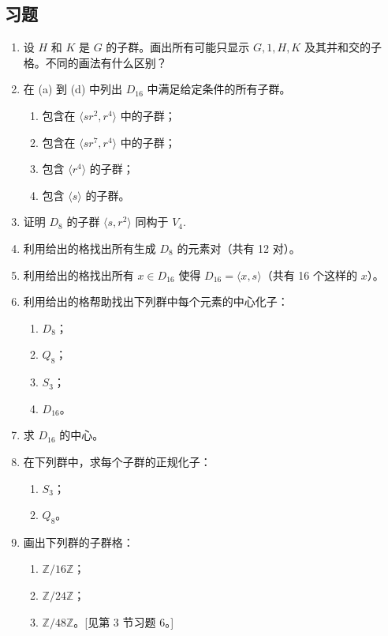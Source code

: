 \subsection*{习题}

\begin{enumerate}[label=\arabic*]
\item 设 \(H\) 和 \(K\) 是 \(G\) 的子群。画出所有可能只显示 \(G, 1, H, K\) 及其并和交的子格。不同的画法有什么区别？

\item 在 (a) 到 (d) 中列出 \(D_{16}\) 中满足给定条件的所有子群。
\begin{enumerate}[label=(\alph*)]
\item 包含在 \(\langle sr^2, r^4 \rangle\) 中的子群；
\item 包含在 \(\langle sr^7, r^4 \rangle\) 中的子群；
\item 包含 \(\langle r^4 \rangle\) 的子群；
\item 包含 \(\langle s \rangle\) 的子群。
\end{enumerate}

\item 证明 \(D_8\) 的子群 \(\langle s, r^2 \rangle\) 同构于 \(V_4\).

\item 利用给出的格找出所有生成 \(D_8\) 的元素对（共有 12 对）。

\item 利用给出的格找出所有 \(x \in D_{16}\) 使得 \(D_{16} = \langle x, s \rangle\)（共有 16 个这样的 \(x\)）。

\item 利用给出的格帮助找出下列群中每个元素的中心化子：
\begin{enumerate}[label=(\alph*)]
\item \(D_8\)；
\item \(Q_8\)；
\item \(S_3\)；
\item \(D_{16}\)。
\end{enumerate}

\item 求 \(D_{16}\) 的中心。

\item 在下列群中，求每个子群的正规化子：
\begin{enumerate}[label=(\alph*)]
\item \(S_3\)；
\item \(Q_8\)。
\end{enumerate}

\item 画出下列群的子群格：
\begin{enumerate}[label=(\alph*)]
\item \(\mathbb{Z}/16\mathbb{Z}\)；
\item \(\mathbb{Z}/24\mathbb{Z}\)；
\item \(\mathbb{Z}/48\mathbb{Z}\)。[见第 3 节习题 6。]
\end{enumerate}


\end{enumerate}
